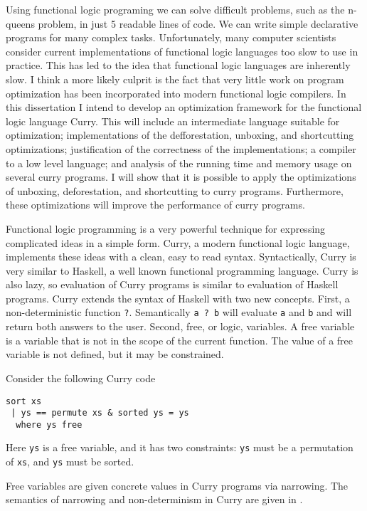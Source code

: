 
Using functional logic programing we can solve difficult problems, such as the n-queens problem, in
just 5 readable lines of code.
We can write simple declarative programs for many complex tasks.
Unfortunately, many computer scientists consider current implementations of functional logic languages
too slow to use in practice.
This has led to the idea that functional logic languages are inherently slow.
I think a more likely culprit is the fact that very little work on program optimization 
has been incorporated into modern functional logic compilers.
In this dissertation I intend to develop an optimization framework for the functional logic language Curry.
This will include an intermediate language suitable for optimization;
implementations of the defforestation, unboxing, and shortcutting optimizations;
justification of the correctness of the implementations;
a compiler to a low level language;
and analysis of the running time and memory usage on several curry programs.
I will show that it is possible to apply the optimizations of unboxing, deforestation, and shortcutting to curry programs.
Furthermore, these optimizations will improve the performance of curry programs.

Functional logic programming is a very powerful technique for expressing complicated ideas in a simple form.
Curry, a modern functional logic language, implements these ideas with a clean, easy to read syntax.
Syntactically, Curry is very similar to Haskell, a well known functional programming language.
Curry is also lazy, so evaluation of Curry programs is similar to evaluation of Haskell programs.
Curry extends the syntax of Haskell with two new concepts.
First, a non-deterministic function \texttt{?}.  
Semantically \texttt{a ? b} will evaluate \texttt{a} and \texttt{b} and will return both answers to the user.
Second, free, or logic, variables.
A free variable is a variable that is not in the scope of the current function.
The value of a free variable is not defined, but it may be constrained.

Consider the following Curry code
\begin{verbatim}
sort xs
 | ys == permute xs & sorted ys = ys
  where ys free
\end{verbatim}
Here \texttt{ys} is a free variable, and it has two constraints:
\texttt{ys} must be a permutation of \texttt{xs}, and \texttt{ys} must be sorted.

Free variables are given concrete values in Curry programs via narrowing.
The semantics of narrowing and non-determinism in Curry are given in \cite{}.


